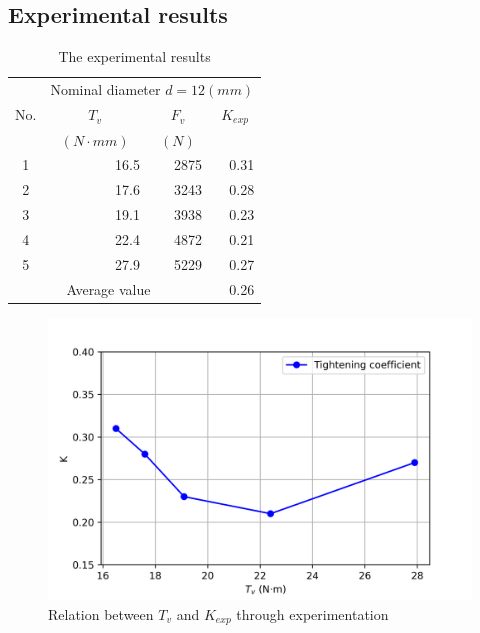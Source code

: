 \subsection{Experimental results}
\begin{table}[h!t]
	\centering
	\renewcommand{\arraystretch}{1.5}
	\begin{tabular}{crrr}
		\toprule
		&
		\multicolumn{3}{c}{Nominal diameter $d=12\unit{(mm)}$} \\ \cmidrule{2-4} 
		\multirow{-2}{*}{No.} &
		\multicolumn{1}{c}{$T_v$} &
		\multicolumn{1}{c}{$F_v$} &
		\multicolumn{1}{c}{$K_{exp}$} \\
		& \multicolumn{1}{c}{$ \unit{(N\cdot mm)} $} & \multicolumn{1}{c}{$ \unit{(N)} $} & \\
		\midrule
		1                   &  16.5                 &       2875            &  0.31\\
		2                  &     17.6              &       3243            & 0.28 \\
		3                   &      19.1             &         3938        & 0.23 \\
		4                   &   22.4                &      4872             & 0.21 \\
		5                   &   27.9                &        5229           &  0.27\\
		\multicolumn{3}{|c|}{\cellcolor[HTML]{C0C0C0}Average value} & 0.26 \\ \hline
	\end{tabular}
	\caption{The experimental results}
	\label{tab:my-table}
\end{table}
\begin{figure}
	\centering
	\includegraphics[width=150mm]{exp3.png}
	\caption{Relation between $ T_v $ and $ K_{exp} $ through experimentation}
	\label{tvk}
\end{figure}
